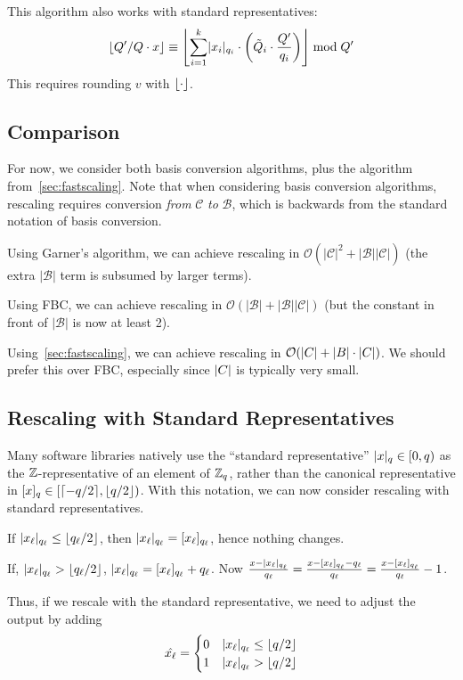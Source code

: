\documentclass[../keyswitching.tex]{subfiles}
\begin{document}
This algorithm also works with standard representatives:
\[\floor{Q'/Q\cdot x} \equiv \floor*{\sum_{i=1}^k \abs{x_i}_{q_i}\cdot\parens*{\tilde{Q}_i\cdot\frac{Q'}{q_i}}} \bmod Q'\]
This requires rounding $v$ with $\floor{\cdot}$.

\subsection{Comparison}
For now, we consider both basis conversion algorithms, plus the algorithm from~\cref{sec:fastscaling}. Note that when considering basis conversion algorithms, rescaling requires conversion \emph{from} $\mathcal{C}$ \emph{to} $\mathcal{B}$, which is backwards from the standard notation of basis conversion.

Using Garner's algorithm, we can achieve rescaling in $\mathcal{O}(|\mathcal{C}|^2+|\mathcal{B}||\mathcal{C}|)$ (the extra $|\mathcal{B}|$ term is subsumed by larger terms).

Using FBC, we can achieve rescaling in $\mathcal{O}(|\mathcal{B}|+|\mathcal{B}||\mathcal{C}|)$ (but the constant in front of $|\mathcal{B}|$ is now at least 2).

Using~\cref{sec:fastscaling}, we can achieve rescaling in $\mathcal{O}(\abs{C}+\abs{B}\cdot \abs{C})$. We should prefer this over FBC, especially since $\abs{C}$ is typically very small.

\subsection{Rescaling with Standard Representatives}
Many software libraries natively use the ``standard representative'' $\abs{x}_q\in [0, q)$ as the $\Z$-representative of an element of $\Z_q$, rather than the canonical representative in $\bracks{x}_q\in [\ceil{-q/2}, \floor{q/2})$. With this notation, we can now consider rescaling with standard representatives.

If $\abs{x_\ell}_{q_\ell} \le \floor{q_\ell/2}$, then $\abs{x_\ell}_{q_\ell}=\bracks{x_\ell}_{q_\ell}$, hence nothing changes. 

If, $\abs{x_\ell}_{q_\ell} > \floor{q_\ell/2}$, $\abs{x_\ell}_{q_\ell} = \bracks{x_\ell}_{q_\ell}+q_\ell$. Now $\frac{x-\abs{x_\ell}_{q_\ell}}{q_\ell} = \frac{x-\bracks{x_\ell}_{q_\ell}-q_\ell}{q_\ell} = \frac{x-\bracks{x_\ell}_{q_\ell}}{q_\ell} - 1$.

Thus, if we rescale with the standard representative, we need to adjust the output by adding 
\[\hat{x_\ell} = \begin{cases}
	0 & \abs{x_\ell}_{q_\ell} \le \floor{q/2} \\
	1 & \abs{x_\ell}_{q_\ell} > \floor{q/2}
\end{cases}\]
\end{document}
